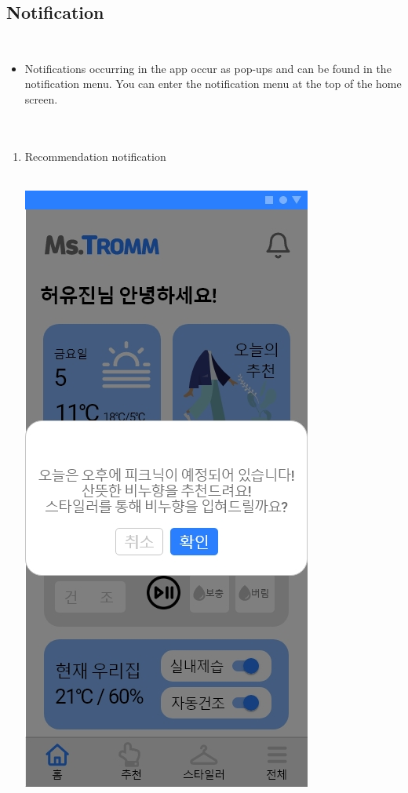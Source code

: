 \documentclass[conference]{IEEEtran}
\begin{document}
\subsection{Notification\\ \\}
\begin{itemize}
    \item[] Notifications occurring in the app occur as pop-ups and can be found in the notification menu. You can enter the notification menu at the top of the home screen.\\ \\ \\
\end{itemize}
\begin{enumerate}
    \item Recommendation notification \\ \\
    \centerline{\includegraphics[scale=0.18]{7. 추천알림.jpg}
}
\end{enumerate}
\end{document}
